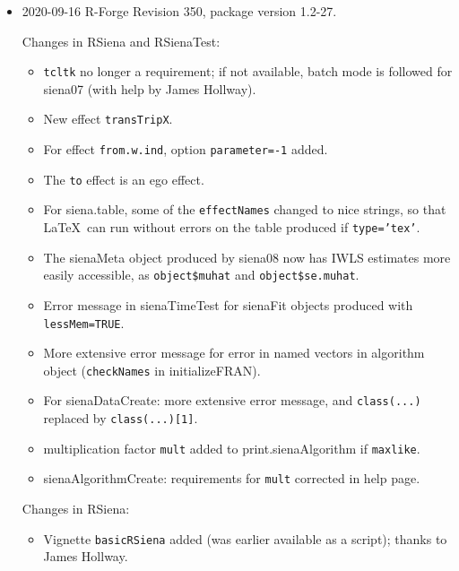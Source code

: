 \documentclass[a4paper,fleqn,11pt]{article}
\newcommand{\+}{\, + \,}
\newcommand{\sfn}[1]{\textsf{#1}}
\begin{document}
\begin{small}
\begin{itemize} %


\item 2020-09-16 R-Forge Revision 350, package version 1.2-27.

Changes in RSiena and RSienaTest:
\begin{itemize}
   \item \texttt{tcltk} no longer a requirement; if not available,
        batch mode is followed for \sfn{siena07} (with help
        by James Hollway).
   \item New effect \texttt{transTripX}.
   \item For effect \texttt{from.w.ind}, option \texttt{parameter=-1} added.
   \item The \texttt{to} effect is an ego effect.
   \item For \sfn{siena.table}, some of the \texttt{effectNames} changed to nice strings,
     so that \LaTeX\ can run without errors 
     on the table produced if \texttt{type='tex'}.
   \item The \sfn{sienaMeta} object produced by \sfn{siena08} now has IWLS estimates more easily
     accessible, as \texttt{object\$muhat} and \texttt{object\$se.muhat}.
   \item Error message in \sfn{sienaTimeTest} for \sfn{sienaFit} objects produced with
     \texttt{lessMem=TRUE}.
   \item More extensive error message for error in named vectors in algorithm object
     (\texttt{checkNames} in \sfn{initializeFRAN}).
   \item For \sfn{sienaDataCreate}: more extensive error message, and \texttt{class(...)} replaced
     by \texttt{class(...)[1]}.
   \item multiplication factor \texttt{mult}
     added to \sfn{print.sienaAlgorithm} if \texttt{maxlike}.
   \item \sfn{sienaAlgorithmCreate}: requirements for \texttt{mult} corrected in help page.
\end{itemize}

Changes in RSiena:
\begin{itemize}
\item Vignette \texttt{basicRSiena} added (was earlier available as a script);
     thanks to James Hollway.
\end{itemize}


\end{itemize}
\end{small}
\end{document}
